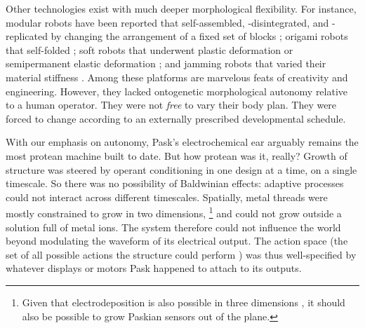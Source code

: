 Other technologies exist with much deeper morphological flexibility.
For instance,
modular robots have been reported that self-assembled, -disintegrated, and -replicated by changing the arrangement of a fixed set of blocks \cite{zykov2005robotics,romanishin20153d,li2019particle,white2005three};
origami robots that self-folded
\cite{hawkes2010programmable,felton2014method,miyashita2017robotic,gladman2016biomimetic};
soft robots that underwent plastic deformation or semipermanent elastic deformation
\cite{shepherd2011multigait,shah2019morphing,shah2020gaining};
and jamming robots that varied their material stiffness \cite{brown2010universal,narang2018transforming,steltz2009jsel}.
Among these platforms are marvelous feats of creativity and engineering.
However, they lacked ontogenetic morphological autonomy relative to a human operator.
They were not \textit{free} to vary their body plan.
They were forced to change according to an externally prescribed developmental schedule.




With our emphasis on autonomy,
Pask's electrochemical ear 
arguably remains the most protean machine built to date.
But how protean was it, really?
Growth of structure was steered by operant conditioning in one design at a time, on a single timescale.
So there was no possibility of Baldwinian effects: adaptive processes could not interact across different timescales.
Spatially,
metal threads were mostly constrained to grow 
in two dimensions,%
\footnote{%
Given that electrodeposition is also possible in three dimensions \cite{madden1995fabrication}, it should also be possible to grow Paskian sensors out of the plane.
}
and could not grow outside a solution full of metal ions.
The system therefore could not influence the world beyond modulating the waveform of its electrical output.
The action space
(the set of all possible actions the structure could perform \cite{sutton2018reinforcement})
was thus well-specified by whatever displays or motors Pask happened to attach to its outputs.


